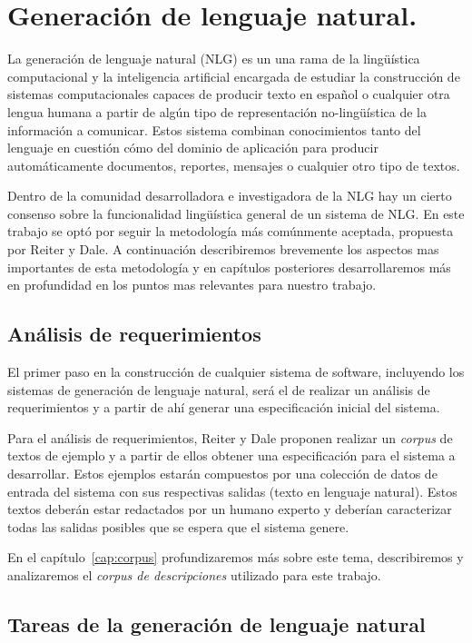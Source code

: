 \chapter{Generación de lenguaje natural.}
\label{cap:nlg_intro}
La generación de lenguaje natural (NLG) es un una rama de la lingüística computacional y la inteligencia artificial encargada de estudiar la construcción de sistemas computacionales capaces de producir texto en español o cualquier otra lengua humana a partir de algún tipo de representación no-lingüística de la información a comunicar. Estos sistema combinan conocimientos tanto del lenguaje en cuestión cómo del dominio de aplicación para producir automáticamente documentos, reportes, mensajes o cualquier otro tipo de textos.

Dentro de la comunidad desarrolladora e investigadora de la NLG hay un cierto consenso sobre la funcionalidad lingüística general de un sistema de NLG.
En este trabajo se optó por seguir la metodología más comúnmente aceptada, propuesta por Reiter y Dale\cite{reiterdale}.
A continuación describiremos brevemente los aspectos mas importantes de esta metodología y en capítulos posteriores desarrollaremos más en profundidad en los puntos mas relevantes para nuestro trabajo.

\section{Análisis de requerimientos}
El primer paso en la construcción de cualquier sistema de software, incluyendo los sistemas de generación de lenguaje natural, será el de realizar un análisis de requerimientos y a partir de ahí generar una especificación inicial del sistema. 

Para el análisis de requerimientos, Reiter y Dale proponen realizar un \emph{corpus} de textos de ejemplo y a partir de ellos obtener una especificación para el sistema a desarrollar. Estos ejemplos estarán compuestos por una colección de datos de entrada del sistema con sus respectivas salidas (texto en lenguaje natural). Estos textos deberán estar redactados por un humano experto y deberían caracterizar todas las salidas posibles que se espera que el sistema genere.

En el capítulo~\ref{cap:corpus} profundizaremos más sobre este tema, describiremos y analizaremos el \emph{corpus de descripciones} utilizado para este trabajo.

\section{Tareas de la generación de lenguaje natural}

